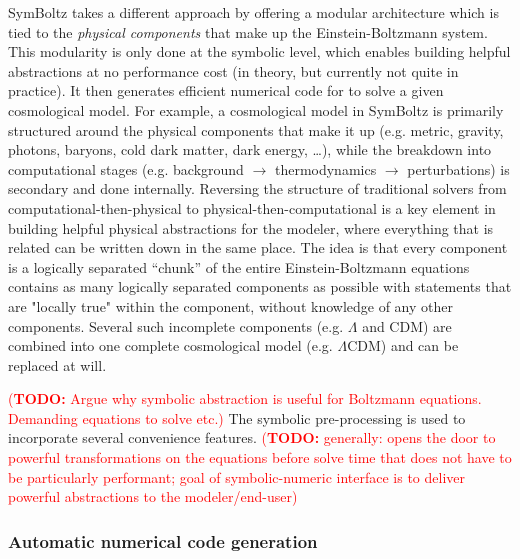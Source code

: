 \documentclass{aa}
\newcommand\TODO[1]{\textcolor{red}{(\textbf{TODO:} #1)}}
\begin{document}
SymBoltz takes a different approach by offering a modular architecture which is tied to the \emph{physical components} that make up the Einstein-Boltzmann system.
This modularity is only done at the symbolic level, which enables building helpful abstractions at no performance cost (in theory, but currently not quite in practice).
It then generates efficient numerical code for to solve a given cosmological model.
For example, a cosmological model in SymBoltz is primarily structured around the physical components that make it up (e.g. metric, gravity, photons, baryons, cold dark matter, dark energy, \ldots), while the breakdown into computational stages (e.g. background $\rightarrow$ thermodynamics $\rightarrow$ perturbations) is secondary and done internally.
Reversing the structure of traditional solvers from computational-then-physical to physical-then-computational is a key element in building helpful physical abstractions for the modeler, where everything that is related can be written down in the same place.
The idea is that every component is a logically separated \enquote{chunk} of the entire Einstein-Boltzmann equations contains as many logically separated components as possible with statements that are "locally true" within the component, without knowledge of any other components.
Several such incomplete components (e.g. $\Lambda$ and CDM) are combined into one complete cosmological model (e.g. $\Lambda$CDM) and can be replaced at will.

\TODO{Argue why symbolic abstraction is useful for Boltzmann equations. Demanding equations to solve etc.}
The symbolic pre-processing is used to incorporate several convenience features.
\TODO{generally: opens the door to powerful transformations on the equations before solve time that does not have to be particularly performant; goal of symbolic-numeric interface is to deliver powerful abstractions to the modeler/end-user}
\fi

\subsubsection{Automatic numerical code generation}
\label{sec:codegen}
\end{document}
